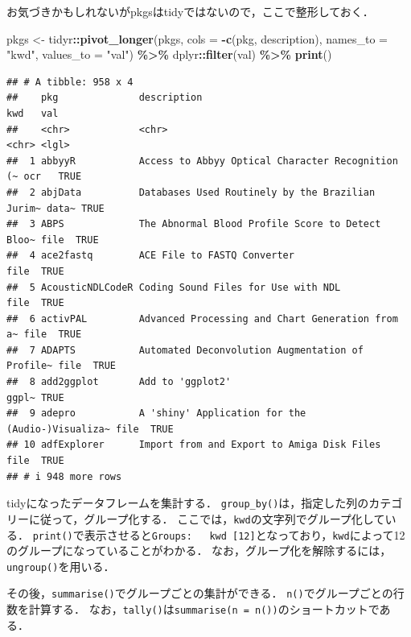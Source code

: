 \documentclass[
]{article}
\newenvironment{Shaded}{\begin{snugshade}}{\end{snugshade}}
\newcommand{\AttributeTok}[1]{\textcolor[rgb]{0.13,0.29,0.53}{#1}}
\newcommand{\FunctionTok}[1]{\textcolor[rgb]{0.13,0.29,0.53}{\textbf{#1}}}
\newcommand{\NormalTok}[1]{#1}
\newcommand{\OtherTok}[1]{\textcolor[rgb]{0.56,0.35,0.01}{#1}}
\newcommand{\SpecialCharTok}[1]{\textcolor[rgb]{0.81,0.36,0.00}{\textbf{#1}}}
\newcommand{\StringTok}[1]{\textcolor[rgb]{0.31,0.60,0.02}{#1}}
\begin{document}
お気づきかもしれないがpkgsはtidyではないので，ここで整形しておく．

\begin{Shaded}
\begin{Highlighting}[]
\NormalTok{pkgs }\OtherTok{\textless{}{-}} 
\NormalTok{  tidyr}\SpecialCharTok{::}\FunctionTok{pivot\_longer}\NormalTok{(pkgs, }
    \AttributeTok{cols =} \SpecialCharTok{{-}}\FunctionTok{c}\NormalTok{(pkg, description), }\AttributeTok{names\_to =} \StringTok{"kwd"}\NormalTok{, }\AttributeTok{values\_to =} \StringTok{"val"}\NormalTok{) }\SpecialCharTok{\%\textgreater{}\%}
\NormalTok{    dplyr}\SpecialCharTok{::}\FunctionTok{filter}\NormalTok{(val) }\SpecialCharTok{\%\textgreater{}\%}
    \FunctionTok{print}\NormalTok{()}
\end{Highlighting}
\end{Shaded}

\begin{verbatim}
## # A tibble: 958 x 4
##    pkg              description                                      kwd   val  
##    <chr>            <chr>                                            <chr> <lgl>
##  1 abbyyR           Access to Abbyy Optical Character Recognition (~ ocr   TRUE 
##  2 abjData          Databases Used Routinely by the Brazilian Jurim~ data~ TRUE 
##  3 ABPS             The Abnormal Blood Profile Score to Detect Bloo~ file  TRUE 
##  4 ace2fastq        ACE File to FASTQ Converter                      file  TRUE 
##  5 AcousticNDLCodeR Coding Sound Files for Use with NDL              file  TRUE 
##  6 activPAL         Advanced Processing and Chart Generation from a~ file  TRUE 
##  7 ADAPTS           Automated Deconvolution Augmentation of Profile~ file  TRUE 
##  8 add2ggplot       Add to 'ggplot2'                                 ggpl~ TRUE 
##  9 adepro           A 'shiny' Application for the (Audio-)Visualiza~ file  TRUE 
## 10 adfExplorer      Import from and Export to Amiga Disk Files       file  TRUE 
## # i 948 more rows
\end{verbatim}

tidyになったデータフレームを集計する．
\texttt{group\_by()}は，指定した列のカテゴリーに従って，グループ化する．
ここでは，\texttt{kwd}の文字列でグループ化している．
\texttt{print()}で表示させると\texttt{Groups:\ \ \ kwd\ {[}12{]}}となっており，\texttt{kwd}によって12のグループになっていることがわかる．
なお，グループ化を解除するには，\texttt{ungroup()}を用いる．

その後，\texttt{summarise()}でグループごとの集計ができる．
\texttt{n()}でグループごとの行数を計算する．
なお，\texttt{tally()}は\texttt{summarise(n\ =\ n())}のショートカットである．
\end{document}
